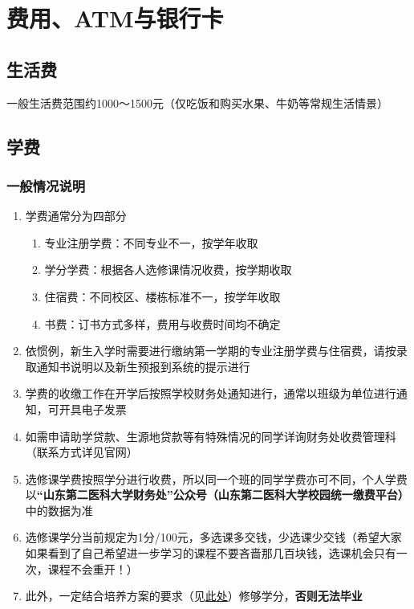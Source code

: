 \section[费用、ATM与银行卡]{费用、ATM与银行卡}

\subsection[生活费]{生活费}
一般生活费范围约1000～1500元（仅吃饭和购买水果、牛奶等常规生活情景）

\subsection[学费]{学费\footnotemark}
\subsubsection[一般情况说明]{一般情况说明}
\begin{enumerate}
    \item 学费通常分为四部分\footnotemark
          \begin{enumerate}
              \item 专业注册学费：不同专业不一，按学年收取
              \item 学分学费：根据各人选修课情况收费，按学期收取
              \item 住宿费：不同校区、楼栋标准不一，按学年收取
              \item 书费：订书方式多样，费用与收费时间均不确定
          \end{enumerate}
    \item 依惯例，新生入学时需要进行缴纳第一学期的专业注册学费与住宿费，请按录取通知书说明以及新生预报到系统\footnotemark 的提示进行
    \item 学费的收缴工作在开学后按照学校财务处通知进行，通常以班级为单位进行通知，可开具电子发票
    \item 如需申请助学贷款、生源地贷款等有特殊情况的同学详询财务处收费管理科（联系方式详见官网）
    \item 选修课学费按照学分进行收费，所以同一个班的同学学费亦可不同，个人学费以\textbf{“山东第二医科大学财务处”公众号（山东第二医科大学校园统一缴费平台）}中的数据为准
    \item 选修课学分当前规定为1分/100元，多选课多交钱，少选课少交钱（希望大家如果看到了自己希望进一步学习的课程不要吝啬那几百块钱，选课机会只有一次，课程不会重开！）
    \item 此外，一定结合培养方案的要求（见\hyperref[score]{此处}）修够学分，\textbf{否则无法毕业}
\end{enumerate}

